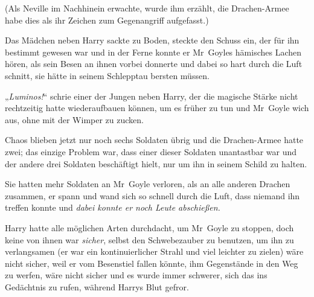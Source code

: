 (Als Neville im Nachhinein erwachte, wurde ihm erzählt, die Drachen-Armee habe dies als ihr Zeichen zum Gegenangriff aufgefasst.)

\later

Das Mädchen neben Harry sackte zu Boden, steckte den Schuss ein, der für ihn bestimmt gewesen war und in der Ferne konnte er Mr~Goyles hämisches Lachen hören, als sein Besen an ihnen vorbei donnerte und dabei so hart durch die Luft schnitt, sie hätte in seinem Schlepptau bersten müssen.

„\emph{Luminos!}“ schrie einer der Jungen neben Harry, der die magische Stärke nicht rechtzeitig hatte wiederaufbauen können, um es früher zu tun und Mr~Goyle wich aus, ohne mit der Wimper zu zucken.

Chaos blieben jetzt nur noch sechs Soldaten übrig und die Drachen-Armee hatte zwei; das einzige Problem war, dass einer dieser Soldaten unantastbar war und der andere drei Soldaten beschäftigt hielt, nur um ihn in seinem Schild zu halten.

Sie hatten mehr Soldaten an Mr~Goyle verloren, als an alle anderen Drachen zusammen, er spann und wand sich so schnell durch die Luft, dass niemand ihn treffen konnte und \emph{dabei konnte er noch Leute abschießen.}

Harry hatte alle möglichen Arten durchdacht, um Mr~Goyle zu stoppen, doch keine von ihnen war \emph{sicher}, selbst den Schwebezauber zu benutzen, um ihn zu verlangsamen (er war ein kontinuierlicher Strahl und viel leichter zu zielen) wäre nicht sicher, weil er vom Besenstiel fallen könnte, ihm Gegenstände in den Weg zu werfen, wäre nicht sicher und es wurde immer schwerer, sich das ins Gedächtnis zu rufen, während Harrys Blut gefror.

